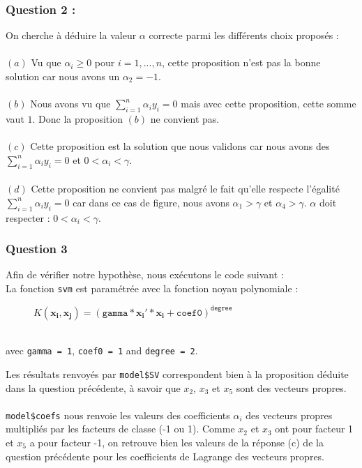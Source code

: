 \documentclass[a4paper, 10pt]{article}
\begin{document}
\subsubsection*{Question 2 :}

On cherche à déduire la valeur $\alpha$ correcte parmi les différents choix proposés :\\ \\
$(a)$ Vu que $\alpha_{i} \geq 0$ pour $i = 1, ..., n$, cette proposition n'est pas la bonne solution car nous avons un $\alpha_{2} = -1$.\\ \\
$(b)$ Nous avons vu que $\sum^{n}_{i=1}\alpha_{i}y_{i} = 0$ mais avec cette proposition, cette somme vaut $1$. Donc la proposition $(b)$ ne convient pas.\\ \\
$(c)$ Cette proposition est la solution que nous validons car nous avons des $\sum^{n}_{i=1}\alpha_{i}y_{i} = 0$ et $0 < \alpha_{i} < \gamma$.\\ \\
$(d)$ Cette proposition ne convient pas malgré le fait qu'elle respecte l'égalité $\sum^{n}_{i=1}\alpha_{i}y_{i} = 0$ car dans ce cas de figure, nous avons $\alpha_{1} > \gamma$ et $\alpha_{4} > \gamma$. $\alpha$ doit respecter : $0 < \alpha_{i} < \gamma$.

\subsubsection*{Question 3}

Afin de vérifier notre hypothèse, nous exécutons le code suivant :\\

La fonction \texttt{svm} est paramétrée avec la fonction noyau polynomiale :
\begin{figure}[h!]
 \centering
$K(\mathbf{x_{i}},\mathbf{x_{j}}) = (\texttt{gamma}*\mathbf{x_{i}}'*\mathbf{x_{i}} + \texttt{coef0})^{\texttt{degree}}$ 
\end{figure}\\
avec \texttt{gamma = 1}, \texttt{coef0 = 1} and \texttt{degree = 2}.

\newpage
\noindent
Les résultats renvoyés par \texttt{model\$SV} correspondent bien à la proposition déduite dans la question précédente, à savoir que $x_{2}$, $x_{3}$ et $x_{5}$ sont des vecteurs propres.\\ \\ \texttt{model\$coefs} nous renvoie les valeurs des coefficients $\alpha_{i}$ des vecteurs propres multipliés par les facteurs de classe (-1 ou 1). Comme $x_{2}$ et $x_{3}$ ont pour facteur 1 et $x_{5}$ a pour facteur -1, on retrouve bien les valeurs de la réponse (c) de la question précédente pour les coefficients de Lagrange des vecteurs propres.
\end{document}
